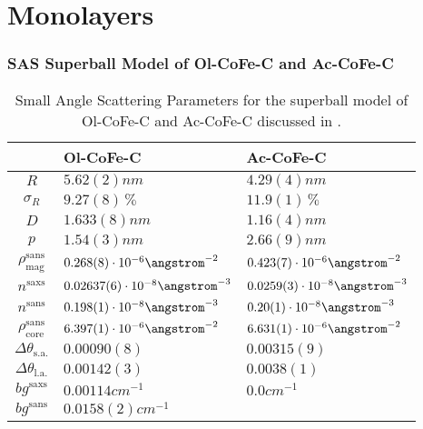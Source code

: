 \documentclass[\main/dresen_thesis.tex]{subfiles}
\begin{document}
\section{Monolayers}
  \subsubsection{SAS Superball Model of Ol-CoFe-C and Ac-CoFe-C}\label{ch:appendix:modelparameters:monolayers:sas_olac_cofe_c}
    \begin{table}[ht]
      \centering
      \caption{\label{tab:appendix:modelparamters:monolayers:nanoparticle:sas}Small Angle Scattering Parameters for the superball model of Ol-CoFe-C and Ac-CoFe-C discussed in .}
      \begin{tabular}{ c | l | l }
          & Ol-CoFe-C & Ac-CoFe-C \\
        \hline
        $R$
          & $5.62(2) \unit{nm}$
          & $4.29(4) \unit{nm}$\\
        $\sigma_R$
          & $9.27(8) \,\%$
          & $11.9(1) \,\%$\\
        $D$
          & $1.633(8) \unit{nm}$
          & $1.16(4) \unit{nm}$\\
        $p$
          & $1.54(3) \unit{nm}$
          & $2.66(9) \unit{nm}$\\
        $\rho_\mathrm{mag}^\mathrm{sans}$
          & $0.268(8) \cdot 10^{-6} \angstrom^{-2}$
          & $0.423(7) \cdot 10^{-6} \angstrom^{-2}$\\
        \hline
        $n^\mathrm{saxs}$
          & $0.02637(6) \cdot 10^{-8} \angstrom^{-3}$
          & $0.0259(3) \cdot 10^{-8} \angstrom^{-3}$\\
        $n^\mathrm{sans}$
          & $0.198(1) \cdot 10^{-8} \angstrom^{-3}$
          & $0.20(1) \cdot 10^{-8} \angstrom^{-3}$\\
        $\rho_\mathrm{core}^\mathrm{sans}$
          & $6.397(1) \cdot 10^{-6} \angstrom^{-2}$
          & $6.631(1) \cdot 10^{-6} \angstrom^{-2}$\\
        $\Delta \theta_\mathrm{s. a.}$
          & $0.00090(8)$
          & $0.00315(9)$\\
        $\Delta \theta_\mathrm{l. a.}$
          & $0.00142(3)$
          & $0.0038(1)$\\
        $bg^\mathrm{saxs}$
          & $0.00114 \unit{cm}^{-1}$
          & $0.0 \unit{cm}^{-1}$\\
        $bg^\mathrm{sans}$
          & $0.0158(2) \unit{cm}^{-1}$

\end{tabular}
\end{table}
\end{document}
